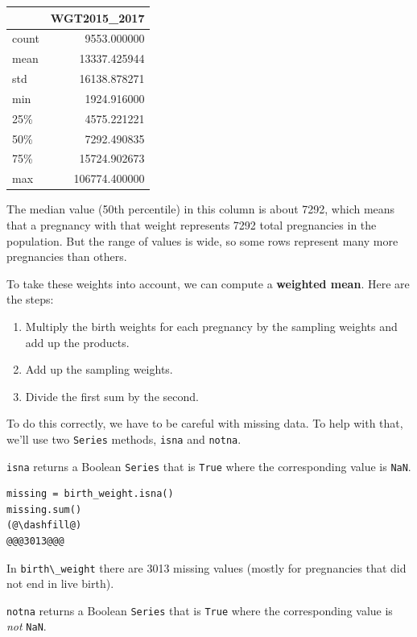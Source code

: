 \begin{tabular}{lr}
\midrule
{} &   WGT2015\_2017 \\
\midrule
count &    9553.000000 \\
mean  &   13337.425944 \\
std   &   16138.878271 \\
min   &    1924.916000 \\
25\%   &    4575.221221 \\
50\%   &    7292.490835 \\
75\%   &   15724.902673 \\
max   &  106774.400000 \\
\midrule
\end{tabular}

The median value (50th percentile) in this column is about 7292, which
means that a pregnancy with that weight represents 7292 total
pregnancies in the population. But the range of values is wide, so some
rows represent many more pregnancies than others.

To take these weights into account, we can compute a \textbf{weighted
mean}. Here are the steps:

\begin{enumerate}
\def\labelenumi{\arabic{enumi}.}
\item
  Multiply the birth weights for each pregnancy by the sampling weights
  and add up the products.
\item
  Add up the sampling weights.
\item
  Divide the first sum by the second.
\end{enumerate}

To do this correctly, we have to be careful with missing data. To help
with that, we'll use two \passthrough{\lstinline!Series!} methods,
\passthrough{\lstinline!isna!} and \passthrough{\lstinline!notna!}.

\passthrough{\lstinline!isna!} returns a Boolean
\passthrough{\lstinline!Series!} that is \passthrough{\lstinline!True!}
where the corresponding value is \passthrough{\lstinline!NaN!}.

\begin{lstlisting}[]
missing = birth_weight.isna()
missing.sum()
(@\dashfill@)
@@@3013@@@
\end{lstlisting}

In \passthrough{\lstinline!birth\_weight!} there are 3013 missing values
(mostly for pregnancies that did not end in live birth).

\passthrough{\lstinline!notna!} returns a Boolean
\passthrough{\lstinline!Series!} that is \passthrough{\lstinline!True!}
where the corresponding value is \emph{not}
\passthrough{\lstinline!NaN!}.

